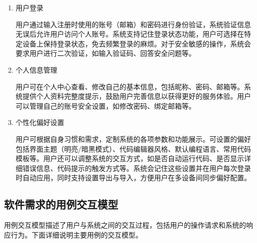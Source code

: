 \documentclass[
    report,     %
    oneside,    %
    UTF8,       %
    zihao=-4    %
]{config} %
\begin{document}
\begin{enumerate}[label=(\arabic*)]
    \item 用户登录
    
    用户通过输入注册时使用的账号（邮箱）和密码进行身份验证，系统验证信息无误后允许用户访问个人账号。系统支持记住登录状态功能，用户可选择在特定设备上保持登录状态，免去频繁登录的麻烦。对于安全敏感的操作，系统会要求用户进行二次验证，如输入验证码、回答安全问题等。
    
    \item 个人信息管理
    
    用户可在个人中心查看、修改自己的基本信息，包括昵称、密码、邮箱等。系统提供个人资料完整度提示，鼓励用户完善信息以获得更好的服务体验。用户可以管理自己的账号安全设置，如修改密码、绑定邮箱等。%
    
    \item 个性化偏好设置
    
    用户可根据自身习惯和需求，定制系统的各项参数和功能展示。可设置的偏好包括界面主题（明亮/暗黑模式）、代码编辑器风格、默认编程语言、常用代码模板等。用户还可以调整系统的交互方式，如是否自动运行代码、是否显示详细错误信息、代码提示的触发方式等。系统会记住这些设置并在用户每次登录时自动应用，同时支持设置导出与导入，方便用户在多设备间同步偏好配置。
\end{enumerate}

\subsection{软件需求的用例交互模型}

用例交互模型描述了用户与系统之间的交互过程，包括用户的操作请求和系统的响应行为。下面详细说明主要用例的交互模型。
\end{document}
